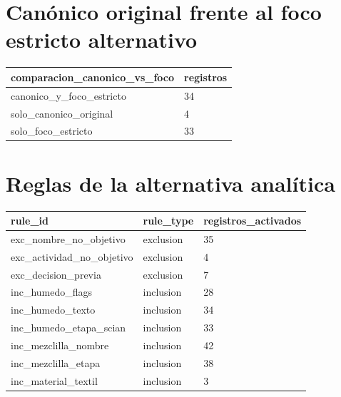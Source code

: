 \documentclass[11pt]{article}
\begin{document}
\section{Canónico original frente al foco estricto alternativo}

\begin{tabular}{ll}
\toprule
comparacion\_canonico\_vs\_foco & registros \\
\midrule
canonico\_y\_foco\_estricto & 34 \\
solo\_canonico\_original & 4 \\
solo\_foco\_estricto & 33 \\
\bottomrule
\end{tabular}

\section{Reglas de la alternativa analítica}

\begin{tabular}{lll}
\toprule
rule\_id & rule\_type & registros\_activados \\
\midrule
exc\_nombre\_no\_objetivo & exclusion & 35 \\
exc\_actividad\_no\_objetivo & exclusion & 4 \\
exc\_decision\_previa & exclusion & 7 \\
inc\_humedo\_flags & inclusion & 28 \\
inc\_humedo\_texto & inclusion & 34 \\
inc\_humedo\_etapa\_scian & inclusion & 33 \\
inc\_mezclilla\_nombre & inclusion & 42 \\
inc\_mezclilla\_etapa & inclusion & 38 \\
inc\_material\_textil & inclusion & 3 \\
\bottomrule
\end{tabular}
\end{document}
